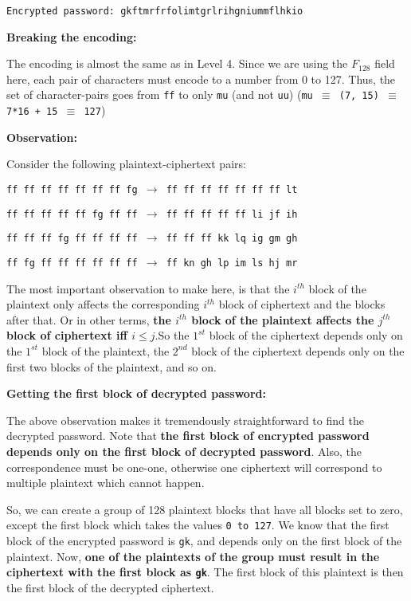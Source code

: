 \documentclass[11pt]{article}
\begin{document}
\begin{center}
  \texttt{Encrypted password: gkftmrfrfolimtgrlrihgniummflhkio}
\end{center}

\bigskip
\bigskip

\textbf{Breaking the encoding: }
\medskip

The encoding is almost the same as in Level 4. Since we are using the $F_{128}$ field here, each pair of characters must encode to a number from 0 to 127. Thus, the set of character-pairs goes from \texttt{ff} to only \texttt{mu} (and not \texttt{uu}) (\texttt{mu $\equiv$ (7, 15) $\equiv$ 7*16 + 15 $\equiv$ 127})

\medskip
\pagebreak

\textbf{Observation: }
\medskip

Consider the following plaintext-ciphertext pairs:

\begin{center}
\texttt{ff ff ff ff ff ff ff fg $\rightarrow$ ff ff ff ff ff ff ff lt}

\texttt{ff ff ff ff ff fg ff ff $\rightarrow$ ff ff ff ff ff li jf ih}

\texttt{ff ff ff fg ff ff ff ff $\rightarrow$ ff ff ff kk lq ig gm gh}

\texttt{ff fg ff ff ff ff ff ff $\rightarrow$ ff kn gh lp im ls hj mr}
\end{center}
\medskip

The most important observation to make here, is that the $i^{th}$ block of the plaintext only affects the corresponding $i^{th}$ block of ciphertext and the blocks after that. Or in other terms, \textbf{the $i^{th}$ block of the plaintext affects the $j^{th}$ block of ciphertext iff $i \leq j$}.So the $1^{st}$ block of the ciphertext depends only on the $1^{st}$ block of the plaintext, the $2^{nd}$ block of the ciphertext depends only on the first two blocks of the plaintext, and so on.

\medskip
\bigskip

\textbf{Getting the first block of decrypted password: }
\medskip

The above observation makes it tremendously straightforward to find the decrypted password. Note that \textbf{the first block of encrypted password depends only on the first block of decrypted password}. Also, the correspondence must be one-one, otherwise one ciphertext will correspond to multiple plaintext which cannot happen.
\medskip

So, we can create a group of 128 plaintext blocks that have all blocks set to zero, except the first block which takes the values \texttt{0 to 127}. We know that the first block of the encrypted password is \texttt{gk}, and depends only on the first block of the plaintext. Now, \textbf{one of the plaintexts of the group must result in the ciphertext with the first block as \texttt{gk}}. The first block of this plaintext is then the first block of the decrypted ciphertext.
\medskip
\bigskip
\end{document}
